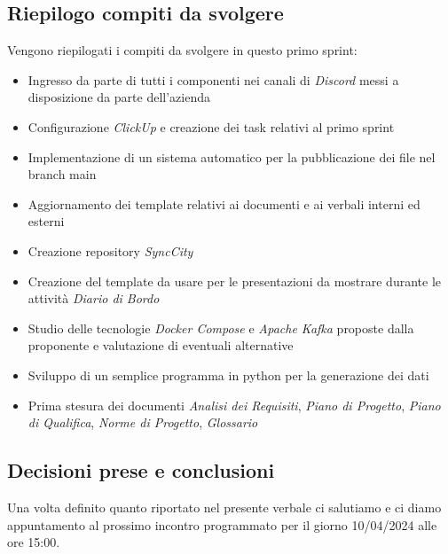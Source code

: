 \documentclass[italian,12pt]{article}
\begin{document}
\subsection{Riepilogo compiti da svolgere}
Vengono riepilogati i compiti da svolgere in questo primo sprint:
\begin{itemize}
	\item Ingresso da parte di tutti i componenti nei canali di \textit{Discord} messi a disposizione da parte dell'azienda
	\item Configurazione \textit{ClickUp} e creazione dei task relativi al primo sprint
	\item Implementazione di un sistema automatico per la pubblicazione dei file nel branch main
	\item Aggiornamento dei template relativi ai documenti e ai verbali interni ed esterni
	\item Creazione repository \textit{SyncCity}
	\item Creazione del template da usare per le presentazioni da mostrare durante le attività \textit{Diario di Bordo}
	\item Studio delle tecnologie \textit{Docker Compose} e \textit{Apache Kafka} proposte dalla proponente e valutazione di eventuali alternative
	\item Sviluppo di un semplice programma in python per la generazione dei dati
	\item Prima stesura dei documenti \textit{Analisi dei Requisiti}, \textit{Piano di Progetto}, \textit{Piano di Qualifica}, \textit{Norme di Progetto}, \textit{Glossario}
\end{itemize}

\subsection{Decisioni prese e conclusioni}
Una volta definito quanto riportato nel presente verbale ci salutiamo e ci diamo appuntamento al prossimo incontro programmato 
per il giorno 10/04/2024 alle ore 15:00.
\end{document}
